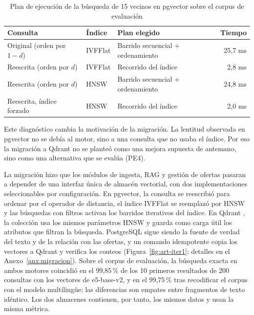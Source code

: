 \begin{table}[htbp!]
    \centering
    \caption{Plan de ejecución de la búsqueda de 15 vecinos en pgvector sobre el corpus de evaluación}
    \label{tab:art-explain}
    \small
    \begin{tabular}{|p{5.2cm}|p{2.2cm}|p{4.6cm}|r|}
        \hline
        \textbf{Consulta} & \textbf{Índice} & \textbf{Plan elegido} & \textbf{Tiempo} \\
        \hline
        Original (orden por $1-d$) & IVFFlat & Barrido secuencial + ordenamiento & 25,7 ms \\
        \hline
        Reescrita (orden por $d$) & IVFFlat & Recorrido del índice & 2,8 ms \\
        \hline
        Reescrita (orden por $d$) & HNSW & Barrido secuencial + ordenamiento & 24,8 ms \\
        \hline
        Reescrita, índice forzado & HNSW & Recorrido del índice & 2,0 ms \\
        \hline
    \end{tabular}
\end{table}

Este diagnóstico cambia la motivación de la migración. La lentitud observada en pgvector no se debía al motor, sino a una consulta que no usaba el índice. Por eso la migración a Qdrant no se planteó como una mejora supuesta de antemano, sino como una alternativa que se evalúa (PE4).

La migración hizo que los módulos de ingesta, RAG y gestión de ofertas pasaran a depender de una interfaz única de almacén vectorial, con dos implementaciones seleccionables por configuración. En pgvector, la consulta se reescribió para ordenar por el operador de distancia, el índice IVFFlat se reemplazó por HNSW \citep{Malkov2020} y las búsquedas con filtros activan los barridos iterativos del índice. En Qdrant \citep{QdrantDocs}, la colección usa los mismos parámetros HNSW y guarda como carga útil los atributos que filtran la búsqueda. PostgreSQL sigue siendo la fuente de verdad del texto y de la relación con las ofertas, y un comando idempotente copia los vectores a Qdrant y verifica los conteos (Figura~\ref{fig:art-iter1}; detalles en el Anexo~\ref{anx:migracion}). Sobre el corpus de evaluación, la búsqueda exacta en ambos motores coincidió en el 99,85\,\% de los 10 primeros resultados de 200 consultas con los vectores de e5-base-v2, y en el 99,75\,\% tras recodificar el corpus con el modelo multilingüe; las diferencias son empates entre fragmentos de texto idéntico. Los dos almacenes contienen, por tanto, los mismos datos y usan la misma métrica.

